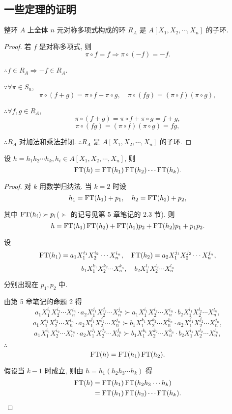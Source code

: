 \documentclass[UTF8]{ctexart}
\begin{document}
\subsection{一些定理的证明}
\begin{theorem}
    整环 $A$ 上全体 $n$ 元对称多项式构成的环 $R_A$ 是 $A[X_1,X_2,\cdots,X_n]$ 的子环.
\end{theorem}
\begin{proof}
    若 $f$ 是对称多项式, 则
    \[\pi\circ f=f\Rightarrow\pi\circ(-f)=-f.\]

    $\therefore f\in R_A\Rightarrow-f\in R_A$.

    $\because\forall\pi\in S_n$,
    \[\pi\circ(f+g)=\pi\circ f+\pi\circ g,\quad\pi\circ(fg)=(\pi\circ f)(\pi\circ g),\]

    $\therefore\forall f,g\in R_A$,
    \[\pi\circ(f+g)=\pi\circ f+\pi\circ g=f+g,\]
    \[\pi\circ(fg)=(\pi\circ f)(\pi\circ g)=fg,\]

    $\therefore R_A$ 对加法和乘法封闭. $\therefore R_A$ 是 $A[X_1,X_2,\cdots,X_n]$ 的子环.
\end{proof}
\begin{theorem}[书上的引理 1]
    设 $h=h_1h_2\cdots h_k,h_i\in A[X_1,X_2,\cdots,X_n]$, 则
    \[\operatorname{FT} (h)=\operatorname{FT} (h_1)\operatorname{FT} (h_2)\cdots\operatorname{FT} (h_k).\]
\end{theorem}
\begin{proof}
    对 $k$ 用数学归纳法. 当 $k=2$ 时设
    \[h_1=\operatorname{FT} (h_1)+p_1,\quad h_2=\operatorname{FT} (h_2)+p_2,\]

    其中 $\operatorname{FT} (h_i)\succ p_i$($\succ$ 的记号见第 5 章笔记的 2.3 节). 则
    \[h=\operatorname{FT} (h_1)\operatorname{FT} (h_2)+\operatorname{FT} (h_1)p_2+\operatorname{FT} (h_2)p_1+p_1p_2.\]

    设
    \[\operatorname{FT} (h_1)=a_1X_1^{i_1}X_2^{i_2}\cdots X_n^{i_n},\quad\operatorname{FT} (h_2)=a_2X_1^{j_1}X_2^{j_2}\cdots X_n^{j_n},\]
    \[b_1X_1^{k_1}X_2^{k_2}\cdots X_n^{k_n},\quad b_2X_1^{l_1}X_2^{l_2}\cdots X_n^{l_n}\]

    分别出现在 $p_1,p_2$ 中.

    由第 5 章笔记的命题 2 得
    \[a_1X_1^{i_1}X_2^{i_2}\cdots X_n^{i_n}\cdot a_2X_1^{j_1}X_2^{j_2}\cdots X_n^{j_n}\succ a_1X_1^{i_1}X_2^{i_2}\cdots X_n^{i_n}\cdot b_2X_1^{l_1}X_2^{l_2}\cdots X_n^{l_n},\]
    \[a_1X_1^{i_1}X_2^{i_2}\cdots X_n^{i_n}\cdot a_2X_1^{j_1}X_2^{j_2}\cdots X_n^{j_n}\succ b_1X_1^{k_1}X_2^{k_2}\cdots X_n^{k_n}\cdot a_2X_1^{j_1}X_2^{j_2}\cdots X_n^{j_n},\]
    \[a_1X_1^{i_1}X_2^{i_2}\cdots X_n^{i_n}\cdot a_2X_1^{j_1}X_2^{j_2}\cdots X_n^{j_n}\succ b_1X_1^{k_1}X_2^{k_2}\cdots X_n^{k_n}\cdot b_2X_1^{l_1}X_2^{l_2}\cdots X_n^{l_n},\]

    $\therefore$
    \[\operatorname{FT} (h)=\operatorname{FT} (h_1)\operatorname{FT} (h_2).\]

    假设当 $k-1$ 时成立, 则由 $h=h_1(h_2h_3\cdots h_k)$ 得
    \begin{align*}
        \operatorname{FT} (h) & =\operatorname{FT} (h_1)\operatorname{FT} (h_2h_3\cdots h_k) \\
        & =\operatorname{FT} (h_1)\operatorname{FT} (h_2)\cdots\operatorname{FT} (h_k).\qedhere
    \end{align*}
\end{proof}
\end{document}
